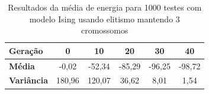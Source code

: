 \begin{table}[h!]
	\centering
	\begin{tabular}{|l|c|c|c|c|c|}
		\hline
		\textbf{Geração}   & \textbf{0} & \textbf{10} & \textbf{20} & \textbf{30} & \textbf{40} \\ \hline
		\textbf{Média}     & -0,02       & -52,34      & -85,29      & -96,25      & -98,72      \\ \hline
		\textbf{Variância} & 180,96     & 120,07      & 36,62       & 8,01       & 1,54       \\ \hline
	\end{tabular}
	\caption{Resultados da média de energia para 1000 testes com modelo Ising usando elitismo mantendo 3 cromossomos}
	\label{tab:resultados_medias_var2}
\end{table}


